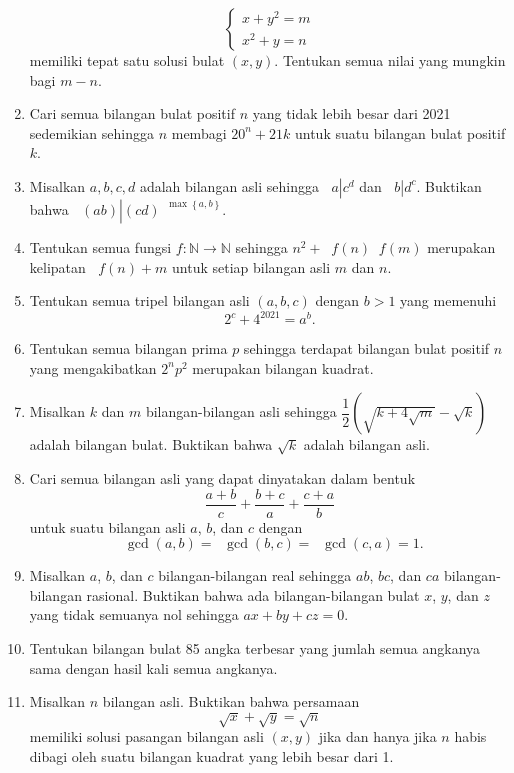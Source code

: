 \documentclass[12pt]{article}
\newcommand*\func[2]{\mathop{}\!{#1}{\left({#2}\right)}}
\newcommand*\funl[2]{\mathop{}\!{#1}{\left\lbrace{#2}\right\rbrace}}
\newcommand*\divid[2]{\mathop{}\!{#1} \left| {#2} \right.}
\begin{document}
\begin{enumerate}[leftmargin=*]
		\[
			\begin{cases}
				x + y^{2} = m \\
				x^{2} + y = n
			\end{cases}
		\]
		memiliki tepat satu solusi bulat $ \left(x, y\right) $. Tentukan semua nilai yang mungkin bagi $ m - n $.
		\item Cari semua bilangan bulat positif $ n $ yang tidak lebih besar dari 2021 sedemikian sehingga $ n $ membagi $ 20^{n} + 21k $ untuk suatu bilangan bulat positif $ k $.
		\item Misalkan $ a, b, c, d $ adalah bilangan asli sehingga $ \divid{a}{c^{d}} $ dan $ \divid{b}{d^{c}} $. Buktikan bahwa $ \divid{\left(ab\right)}{\left(cd\right)^{\funl{\max}{a, b}}} $.
		\item Tentukan semua fungsi $ f : \mathbb{N} \to \mathbb{N} $ sehingga $ n^{2} + \func{f}{n}\func{f}{m} $ merupakan kelipatan $ \func{f}{n} + m $ untuk setiap bilangan asli $ m $ dan $ n $.
		\item Tentukan semua tripel bilangan asli $ \left(a, b, c\right) $ dengan $ b > 1 $ yang memenuhi
		\[ 2^{c} + 4^{2021} = a^{b}. \]
		\item Tentukan semua bilangan prima $ p $ sehingga terdapat bilangan bulat positif $ n $ yang mengakibatkan $ 2^{n}p^{2} $ merupakan bilangan kuadrat.
		\item Misalkan $ k $ dan $ m $ bilangan-bilangan asli sehingga $ \dfrac{1}{2}\left(\sqrt{k + 4\sqrt{m}} - \sqrt{k}\right) $ adalah bilangan bulat. Buktikan bahwa $ \sqrt{k} $ adalah bilangan asli.
		\item Cari semua bilangan asli yang dapat dinyatakan dalam bentuk
		\[ \frac{a + b}{c} + \frac{b + c}{a} + \frac{c + a}{b} \]
		untuk suatu bilangan asli $ a $, $ b $, dan $ c $ dengan
		\[ \func{\gcd}{a, b} = \func{\gcd}{b, c} = \func{\gcd}{c, a} = 1. \]
		\item Misalkan $ a $, $ b $, dan $ c $ bilangan-bilangan real sehingga $ ab $, $ bc $, dan $ ca $ bilangan-bilangan rasional. Buktikan bahwa ada bilangan-bilangan bulat $ x $, $ y $, dan $ z $ yang tidak semuanya nol sehingga $ ax + by + cz = 0 $.
		\item Tentukan bilangan bulat 85 angka terbesar yang jumlah semua angkanya sama dengan hasil kali semua angkanya.
		\item Misalkan $ n $ bilangan asli. Buktikan bahwa persamaan
		\[ \sqrt{x} + \sqrt{y} = \sqrt{n} \]
		memiliki solusi pasangan bilangan asli $ \left(x, y\right) $ jika dan hanya jika $ n $ habis dibagi oleh suatu bilangan kuadrat yang lebih besar dari 1.

\end{enumerate}
\end{document}
